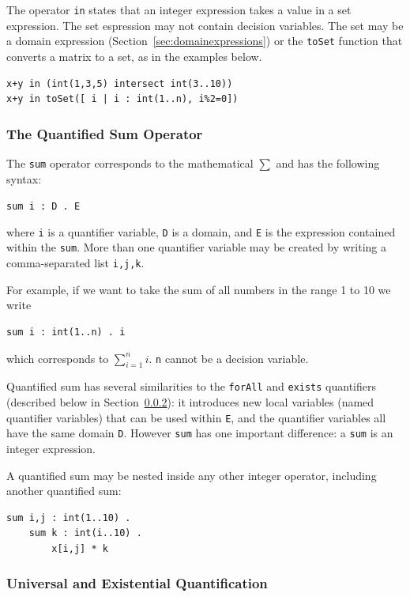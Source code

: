 \documentclass[a4paper]{article}
\begin{document}
The operator \texttt{in} states that an integer expression takes a value in a 
set expression. The set espression may not contain decision variables. 
The set may be a domain expression 
(Section~\ref{sec:domainexpressions}) or the \texttt{toSet} function that
converts a matrix to a set, as in the examples below. 

\begin{verbatim}
x+y in (int(1,3,5) intersect int(3..10))
x+y in toSet([ i | i : int(1..n), i%2=0])
\end{verbatim}

\subsubsection{The Quantified Sum Operator}\label{sub:qsum}

The {\tt sum} operator corresponds to the mathematical 
$\sum$ and has the following syntax:
\begin{center}
{\tt sum i : D . E} 
\end{center}
where {\tt i} is a quantifier variable, {\tt D} is a domain, and {\tt E} is the
expression contained within the {\tt sum}. More than one quantifier variable may
be created by writing a comma-separated list {\tt i,j,k}. 

For example, if we want to take the sum of all numbers in the range 1 to 10 we write

\begin{verbatim}
sum i : int(1..n) . i
\end{verbatim}

which corresponds to $\sum\nolimits_{i=1}^n i$. {\tt n} cannot be a decision 
variable.

Quantified sum has several similarities to the {\tt forAll} and {\tt exists} 
quantifiers (described below in Section~\ref{sub:forallexists}): it introduces
new local variables (named quantifier variables) that can be used within {\tt E}, 
and the quantifier variables all have the same domain {\tt D}. However {\tt sum} 
has one important difference: a {\tt sum} is an integer expression. 

A quantified sum may be nested inside any other integer operator, including another
quantified sum:

\begin{verbatim}
sum i,j : int(1..10) .
    sum k : int(i..10) .
        x[i,j] * k
\end{verbatim}

\subsubsection{Universal and Existential Quantification} \label{sub:forallexists}
\end{document}
